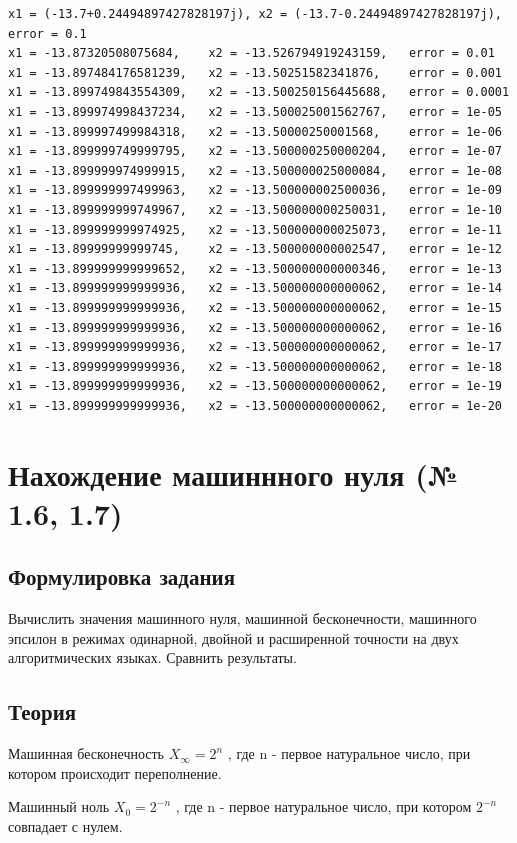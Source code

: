 \documentclass[a4paper,11pt]{article}
\theoremstyle{definition} %
\theoremstyle{remark} %
\begin{document}
\begin{verbatim}
x1 = (-13.7+0.24494897427828197j), x2 = (-13.7-0.24494897427828197j), error = 0.1
x1 = -13.87320508075684,	x2 = -13.526794919243159,	error = 0.01
x1 = -13.897484176581239,	x2 = -13.50251582341876,	error = 0.001
x1 = -13.899749843554309,	x2 = -13.500250156445688,	error = 0.0001
x1 = -13.899974998437234,	x2 = -13.500025001562767,	error = 1e-05
x1 = -13.899997499984318,	x2 = -13.50000250001568,	error = 1e-06
x1 = -13.899999749999795,	x2 = -13.500000250000204,	error = 1e-07
x1 = -13.899999974999915,	x2 = -13.500000025000084,	error = 1e-08
x1 = -13.899999997499963,	x2 = -13.500000002500036,	error = 1e-09
x1 = -13.899999999749967,	x2 = -13.500000000250031,	error = 1e-10
x1 = -13.899999999974925,	x2 = -13.500000000025073,	error = 1e-11
x1 = -13.89999999999745,	x2 = -13.500000000002547,	error = 1e-12
x1 = -13.899999999999652,	x2 = -13.500000000000346,	error = 1e-13
x1 = -13.899999999999936,	x2 = -13.500000000000062,	error = 1e-14
x1 = -13.899999999999936,	x2 = -13.500000000000062,	error = 1e-15
x1 = -13.899999999999936,	x2 = -13.500000000000062,	error = 1e-16
x1 = -13.899999999999936,	x2 = -13.500000000000062,	error = 1e-17
x1 = -13.899999999999936,	x2 = -13.500000000000062,	error = 1e-18
x1 = -13.899999999999936,	x2 = -13.500000000000062,	error = 1e-19
x1 = -13.899999999999936,	x2 = -13.500000000000062,	error = 1e-20
\end{verbatim}


\newpage
\section{Нахождение машиннного нуля (№ 1.6, 1.7)}

\subsection{Формулировка задания}

Вычислить значения машинного нуля, машинной бесконечности, машинного эпсилон в режимах одинарной, двойной и расширенной точности на двух алгоритмических языках. Сравнить результаты.

\subsection{Теория}

Машинная бесконечность $X_\infty = 2^n$ , где n - первое натуральное число, при котором происходит переполнение.

Машинный ноль $X_0 = 2^{-n}$ , где n - первое натуральное число, при котором $2^{-n}$ совпадает с нулем.
\end{document}
